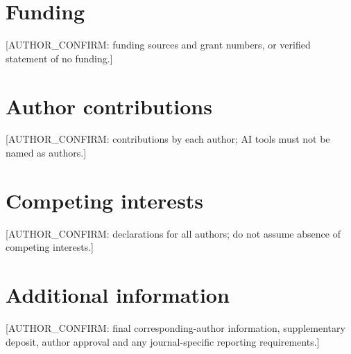 \documentclass[11pt,a4paper]{article}
\begin{document}
\section*{Funding}
[AUTHOR\_CONFIRM: funding sources and grant numbers, or verified statement of no funding.]

\section*{Author contributions}
[AUTHOR\_CONFIRM: contributions by each author; AI tools must not be named as authors.]

\section*{Competing interests}
[AUTHOR\_CONFIRM: declarations for all authors; do not assume absence of competing interests.]

\section*{Additional information}
[AUTHOR\_CONFIRM: final corresponding-author information, supplementary deposit, author approval and any journal-specific reporting requirements.]
\end{document}
